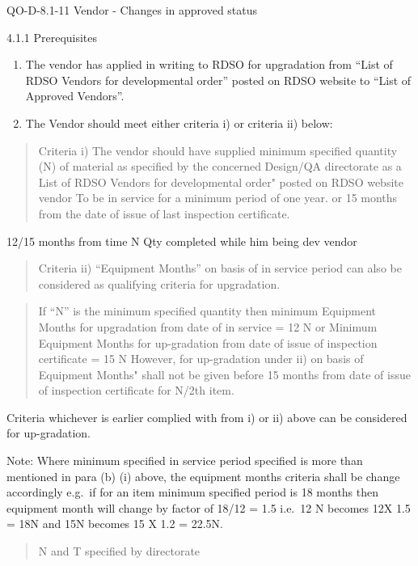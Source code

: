 \documentclass[
  ignorenonframetext,
]{beamer}
\begin{document}
\begin{frame}{QO-D-8.1-11 Vendor - Changes in approved status}
\protect\hypertarget{qo-d-8.1-11-vendor---changes-in-approved-status}{}
\begin{block}{4.1.1 Prerequisites}
\protect\hypertarget{prerequisites}{}
\begin{enumerate}[<+->]
[a)]
\item
  The vendor has applied in writing to RDSO for upgradation from ``List
  of RDSO Vendors for developmental order'' posted on RDSO website to
  ``List of Approved Vendors''.
\item
  The Vendor should meet either criteria i) or criteria ii) below:
\end{enumerate}

\begin{quote}
Criteria i) The vendor should have supplied minimum specified quantity
(N) of material as specified by the concerned Design/QA directorate as a
List of RDSO Vendors for developmental order" posted on RDSO website
vendor To be in service for a minimum period of one year. or 15 months
from the date of issue of last inspection certificate.
\end{quote}

12/15 months from time N Qty completed while him being dev vendor

\begin{quote}
Criteria ii) ``Equipment Months'' on basis of in service period can also
be considered as qualifying criteria for upgradation.
\end{quote}

\begin{quote}
If ``N'' is the minimum specified quantity then minimum Equipment Months
for upgradation from date of in service = 12 N or Minimum Equipment
Months for up-gradation from date of issue of inspection certificate =
15 N However, for up-gradation under ii) on basis of Equipment Months"
shall not be given before 15 months from date of issue of inspection
certificate for N/2th item.
\end{quote}

Criteria whichever is earlier complied with from i) or ii) above can be
considered for up-gradation.

Note: Where minimum specified in service period specified is more than
mentioned in para (b) (i) above, the equipment months criteria shall be
change accordingly e.g.~if for an item minimum specified period is 18
months then equipment month will change by factor of 18/12 = 1.5 i.e.~12
N becomes 12X 1.5 = 18N and 15N becomes 15 X 1.2 = 22.5N.

\begin{quote}
N and T specified by directorate
\end{quote}


\end{block}
\end{frame}
\end{document}
